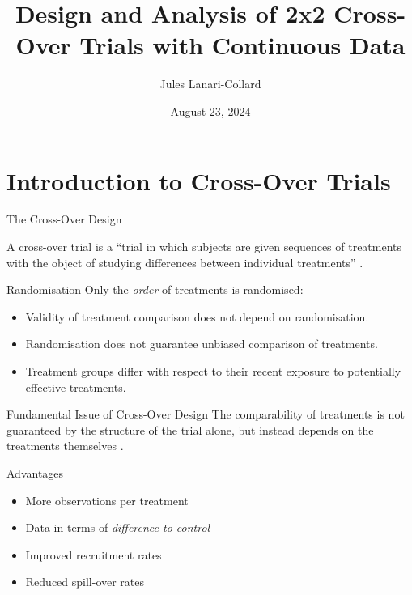 \documentclass{beamer}
\title{Design and Analysis of 2x2 Cross-Over Trials with Continuous Data}
\author{Jules Lanari-Collard}
\institute{McGill University}
\date{August 23, 2024}
\begin{document}
\frame{\titlepage}

\section{Introduction to Cross-Over Trials}
\begin{frame}{The Cross-Over Design}
\begin{definition}
    A cross-over trial is a ``trial in which subjects are given sequences of treatments with the object of studying differences between individual treatments” \cite{senn2002crossover}.
\end{definition}
\end{frame}

\begin{frame}{Randomisation}
    Only the \textit{order} of treatments is randomised:
    \begin{itemize}
        \item Validity of treatment comparison does not depend on randomisation.
        \item Randomisation does not guarantee unbiased comparison of treatments.
        \item Treatment groups differ with respect to their recent exposure to potentially effective treatments.
    \end{itemize}
    
    \begin{alertblock}{Fundamental Issue of Cross-Over Design}
        The comparability of treatments is not guaranteed by the structure of the trial alone, but instead depends on the treatments themselves \cite{piantadosi2005clinical}.
    \end{alertblock}
\end{frame}

\begin{frame}{Advantages}
    \begin{itemize}
        \item More observations per treatment \cite{senn2002crossover}
        \item Data in terms of \textit{difference to control}
        \item Improved recruitment rates
        \item Reduced spill-over rates \cite{piantadosi2005clinical}
    \end{itemize}
\end{frame}
\end{document}
